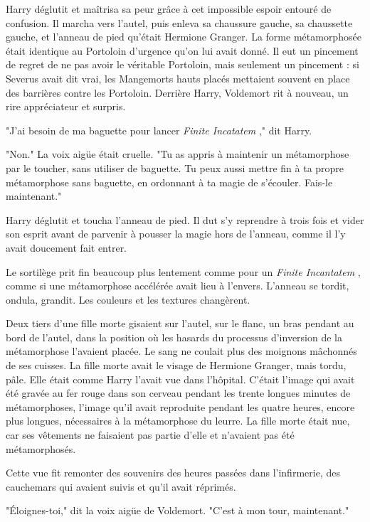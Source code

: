 Harry déglutit et maîtrisa sa peur grâce à cet impossible espoir entouré de confusion. Il marcha vers l'autel, puis enleva sa chaussure gauche, sa chaussette gauche, et l'anneau de pied qu'était Hermione Granger. La forme métamorphosée était identique au Portoloin d'urgence qu'on lui avait donné. Il eut un pincement de regret de ne pas avoir le véritable Portoloin, mais seulement un pincement : si Severus avait dit vrai, les Mangemorts hauts placés mettaient souvent en place des barrières contre les Portoloin. Derrière Harry, Voldemort rit à nouveau, un rire appréciateur et surpris.

"J'ai besoin de ma baguette pour lancer \emph{Finite Incatatem} ," dit Harry.

"Non." La voix aigüe était cruelle. "Tu as appris à maintenir un métamorphose par le toucher, sans utiliser de baguette. Tu peux aussi mettre fin à ta propre métamorphose sans baguette, en ordonnant à ta magie de s'écouler. Fais-le maintenant."

Harry déglutit et toucha l'anneau de pied. Il dut s'y reprendre à trois fois et vider son esprit avant de parvenir à pousser la magie hors de l'anneau, comme il l'y avait doucement fait entrer.

Le sortilège prit fin beaucoup plus lentement comme pour un \emph{Finite Incantatem} , comme si une métamorphose accélérée avait lieu à l'envers. L'anneau se tordit, ondula, grandit. Les couleurs et les textures changèrent.

Deux tiers d'une fille morte gisaient sur l'autel, sur le flanc, un bras pendant au bord de l'autel, dans la position où les hasards du processus d'inversion de la métamorphose l'avaient placée. Le sang ne coulait plus des moignons mâchonnés de ses cuisses. La fille morte avait le visage de Hermione Granger, mais tordu, pâle. Elle était comme Harry l'avait vue dans l'hôpital. C'était l'image qui avait été gravée au fer rouge dans son cerveau pendant les trente longues minutes de métamorphoses, l'image qu'il avait reproduite pendant les quatre heures, encore plus longues, nécessaires à la métamorphose du leurre. La fille morte était nue, car ses vêtements ne faisaient pas partie d'elle et n'avaient pas été métamorphosés.

Cette vue fit remonter des souvenirs des heures passées dans l'infirmerie, des cauchemars qui avaient suivis et qu'il avait réprimés.

"Éloignes-toi," dit la voix aigüe de Voldemort. "C'est à mon tour, maintenant."

